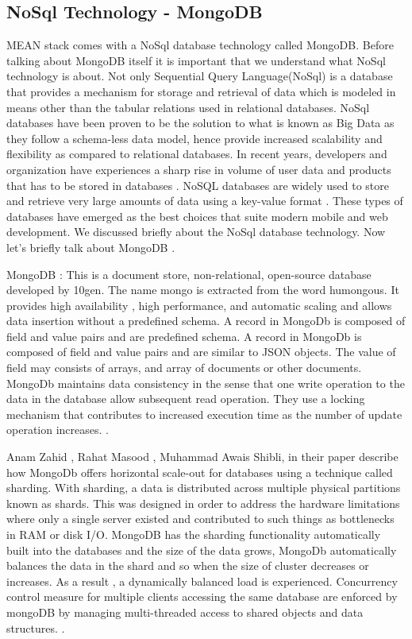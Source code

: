 		\subsection{NoSql Technology - MongoDB}
		MEAN stack comes with a NoSql database technology called MongoDB. Before talking about MongoDB itself it is important that we understand what NoSql technology is about. \cite{NoSqlTechnology}  Not only Sequential Query Language(NoSql) is a database that provides a mechanism for storage and retrieval of data which is modeled in means other than the tabular relations used in relational databases. NoSql databases have been proven to be the solution to what is known as Big Data as they follow a schema-less data model, hence provide increased scalability and flexibility as compared to relational databases. In recent years, developers and organization have experiences a sharp rise in volume of user data and products that has to be stored in databases \cite{MongoOfficial}. NoSQL databases are widely used to store and retrieve very large amounts of data using a key-value format \cite{VeronikaAbramova}. These types of databases have emerged as the best choices that suite modern mobile and web development.
		We discussed briefly about the NoSql database technology. Now let's briefly talk about MongoDB .
		
		MongoDB : This is a document store, non-relational, open-source database developed by 10gen. The name mongo is extracted from the word humongous. It provides high availability , high performance, and automatic scaling and allows data insertion without a predefined schema. A record in MongoDb is composed of field and value pairs and are predefined schema. A record in MongoDb is composed of field and value pairs and are similar to JSON objects. The value of field may consists of arrays, and array of documents or other documents. MongoDb maintains data consistency in the sense that one write operation to the data in the database allow subsequent read operation. They use a locking mechanism that contributes to increased execution time as the number of update operation increases. \cite{MongoOfficial} \cite{EricRedmond}.
		
		
		Anam Zahid , Rahat Masood , Muhammad Awais Shibli, in their paper describe how MongoDb  offers horizontal scale-out  for databases using a technique called sharding. With sharding, a data is distributed across multiple physical partitions known as shards. This was designed in order to address the hardware limitations where only a single server existed and contributed to such things as bottlenecks in RAM or disk I/O. MongoDB has the sharding functionality automatically built into the databases and the size of the data grows, MongoDb automatically balances the data in the shard and so when the size of cluster decreases or increases. As a result , a dynamically balanced load is experienced. Concurrency control measure for multiple clients accessing the same database are enforced by mongoDB by managing multi-threaded access to shared objects and data structures. \cite{MongoOfficial} \cite{MongoDbArchitectureGuide}.
		
